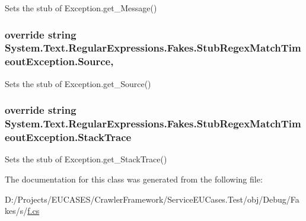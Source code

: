 Sets the stub of Exception.\-get\-\_\-\-Message()

\hypertarget{class_system_1_1_text_1_1_regular_expressions_1_1_fakes_1_1_stub_regex_match_timeout_exception_a1d27614b3f4c8e12fdbbba65c8af46a6}{
\subsubsection[{Source}]{\setlength{\rightskip}{0pt plus 5cm}override string System.\-Text.\-Regular\-Expressions.\-Fakes.\-Stub\-Regex\-Match\-Timeout\-Exception.\-Source\hspace{0.3cm}{\ttfamily [get]}, {\ttfamily [set]}}}\label{class_system_1_1_text_1_1_regular_expressions_1_1_fakes_1_1_stub_regex_match_timeout_exception_a1d27614b3f4c8e12fdbbba65c8af46a6}


Sets the stub of Exception.\-get\-\_\-\-Source()

\hypertarget{class_system_1_1_text_1_1_regular_expressions_1_1_fakes_1_1_stub_regex_match_timeout_exception_adfff948490059ba701aa901d1bf30e9a}{
\subsubsection[{Stack\-Trace}]{\setlength{\rightskip}{0pt plus 5cm}override string System.\-Text.\-Regular\-Expressions.\-Fakes.\-Stub\-Regex\-Match\-Timeout\-Exception.\-Stack\-Trace\hspace{0.3cm}{\ttfamily [get]}}}\label{class_system_1_1_text_1_1_regular_expressions_1_1_fakes_1_1_stub_regex_match_timeout_exception_adfff948490059ba701aa901d1bf30e9a}


Sets the stub of Exception.\-get\-\_\-\-Stack\-Trace()



The documentation for this class was generated from the following file\-:\begin{DoxyCompactItemize}
\item 
D\-:/\-Projects/\-E\-U\-C\-A\-S\-E\-S/\-Crawler\-Framework/\-Service\-E\-U\-Cases.\-Test/obj/\-Debug/\-Fakes/s/\hyperlink{s_2f_8cs}{f.\-cs}\end{DoxyCompactItemize}
